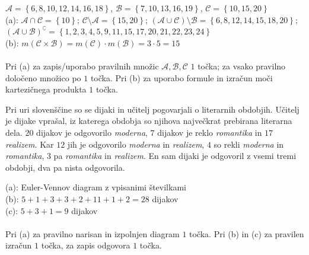 \documentclass[addpoints]{exam}
\begin{document}
\begin{questions}
    \begin{solution}[9cm]
        $\mathcal{A}=\left\{6,8,10,12,14,16,18\right\}$, $\mathcal{B}=\left\{7,10,13,16,19\right\}$, $\mathcal{C}=\left\{10,15,20\right\}$ \\
        (a): $\mathcal{A}\cap\mathcal{C}=\left\{10\right\}$; $\mathcal{C}\setminus\mathcal{A}=\left\{15,20\right\}$; $(\mathcal{A}\cup\mathcal{C})\setminus\mathcal{B}=\left\{6,8,12,14,15,18,20\right\}$; $(\mathcal{A}\cup\mathcal{B})^\complement=\left\{1,2,3,4,5,9,11,15,17,20,21,22,23,24\right\}$ \\
        (b): $m(\mathcal{C}\times\mathcal{B})=m(\mathcal{C})\cdot m(\mathcal{B})=3\cdot 5 = 15$ \\ \\
        Pri (a) za zapis/uporabo pravilnih množic $\mathcal{A}, \mathcal{B}, \mathcal{C}$ $1$ točka; za vsako pravilno določeno množico po $1$ točka. Pri (b) za uporabo formule in izračun moči kartezičnega produkta $1$ točka.
    \end{solution}


   \newpage 
    \question
    Pri uri slovenščine so se dijaki in učitelj pogovarjali o literarnih obdobjih.  Učitelj je dijake vprašal, iz katerega obdobja so njihova največkrat prebirana literarna dela.
    $20$ dijakov je odgovorilo \textit{moderna}, $7$ dijakov je reklo \textit{romantika} in $17$ \textit{realizem}. Kar $12$ jih je odgovorilo \textit{moderna} in \textit{realizem}, $4$ so rekli \textit{moderna} in \textit{romantika},
    $3$ pa \textit{romantika} in \textit{realizem}. En sam dijaki je odgovoril z vsemi tremi obdobji, dva pa nista odgovorila. 

    \begin{solution}[8cm]
        (a): Euler-Vennov diagram z vpisanimi številkami \\
        (b): $5+1+3+3+2+11+1+2=28$ dijakov \\
        (c): $5+3+1=9$ dijakov \\ \\
        Pri (a) za pravilno narisan in izpolnjen diagram $1$ točka. Pri (b) in (c) za pravilen izračun $1$ točka, za zapis odgovora $1$ točka.
    \end{solution}





\end{questions}
\end{document}

